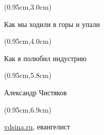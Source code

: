 \documentclass[xetex,18pt,aspectratio=169]{beamer}
\title[Как мы ходили в горы и упали]{}
\author[Александр Чистяков, vdsina.ru]{}
\date{}
\newcommand\Bigfont{\fontsize{20}{20}\selectfont}
\newcommand\Authorfont{\fontsize{17}{17}\selectfont}
\newcommand\Orgfont{\fontsize{13}{13}\selectfont}
\newcommand\Subtitlefont{\fontsize{13}{13}\selectfont}
\begin{document}
{ %
    \begin{frame}[plain]
      \begin{textblock*}{\framewidth}(0.95cm,3.0cm) %
        \Bigfont
          \begin{center}
          Как мы ходили в горы и упали
          \end{center}
      \end{textblock*}
      \begin{textblock*}{\framewidth}(0.95cm,4.0cm) %
        \Subtitlefont
          \begin{center}
          Как я полюбил индустрию
          \end{center}
      \end{textblock*}
      \begin{textblock*}{\framewidth}(0.95cm,5.8cm) %
        \Authorfont
          \begin{center}
          Александр Чистяков
          \end{center}
      \end{textblock*}
      \begin{textblock*}{\framewidth}(0.95cm,6.9cm) %
        \Orgfont
          \begin{center}
          \href{https://vdsina.ru}{\color{linkcolor}vdsina.ru}, евангелист
          \end{center}
      \end{textblock*}
     \end{frame}
}
\end{document}
